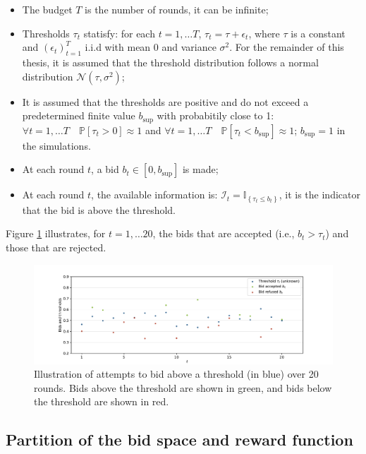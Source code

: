 \documentclass{statsmsc}
\begin{document}
\begin{itemize}
    \item The budget $T$ is the number of rounds, it can be infinite;
    \item Thresholds $\tau_t$ statisfy: for each $t = 1, \dots T$, $\tau_t = \tau + \epsilon_t$, where $\tau$ is a constant
  and $(\epsilon_t)_{t = 1}^T$ i.i.d with mean $0$ and variance $\sigma^2$. For the remainder of this thesis, it is assumed that the threshold distribution follows a normal distribution $\mathcal{N}(\tau, \sigma^2)$;
    \item It is assumed that the thresholds are positive and do not exceed a predetermined finite value $b_{\sup}$ with probabitily close to 1: $\forall t = 1, \dots T \quad \mathbb{P}\left[\tau_t > 0 \right] \approx 1$ and $\forall t = 1, \dots T \quad \mathbb{P}\left[\tau_t < b_{\sup} \right] \approx 1$; $b_{\sup} = 1$ in the simulations.
    \item At each round $t$, a bid $b_t \in \left[0, b_{\sup}\right]$ is made;
    \item At each round $t$, the available information is: $\mathcal{I}_t = \mathbb{I}_{\left\{\tau_t \leq b_t\right\}}$, it is the indicator that the bid is above the threshold.
  \end{itemize}

  Figure \ref{fig:bid-above-threshold}  illustrates, for $t = 1,\dots 20$, the bids that are accepted (i.e., $b_t > \tau_t$) and those that are rejected.


\begin{figure}[htbp]
    \centering
    \includegraphics[width=\textwidth]{images/bid_threshold.pdf}
    \caption{Illustration of attempts to bid above a threshold (in blue) over 20 rounds. Bids above the threshold are shown in green, and bids below the threshold are shown in red.}
    \label{fig:bid-above-threshold}
\end{figure}

\subsection{Partition of the bid space and reward function}\label{subsec:reward_partition}
\end{document}
